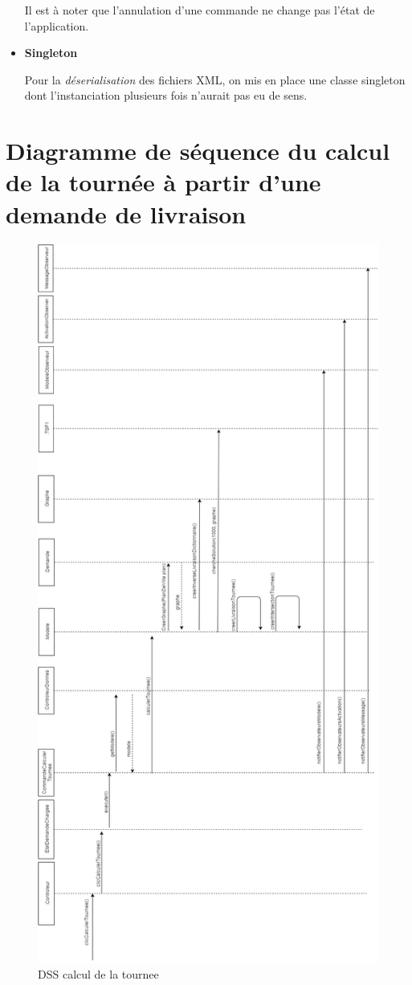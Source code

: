 \documentclass[10pt,a4paper]{book}
\begin{document}
\begin{itemize}
Il est à noter que l'annulation d'une commande ne change pas l'état de l'application.

\item \textbf{Singleton}

Pour la \textit{déserialisation} des fichiers XML, on mis en place une classe singleton dont l'instanciation plusieurs fois n'aurait pas eu de sens. 

\end{itemize}
\newpage
\section{Diagramme de séquence du calcul de la tournée à partir d'une demande de livraison}
\begin{figure}[h!]
    \centering
    \includegraphics[scale=0.37]{tournee2.png}
    \caption{DSS calcul de la tournee}
\end{figure}
\end{document}
